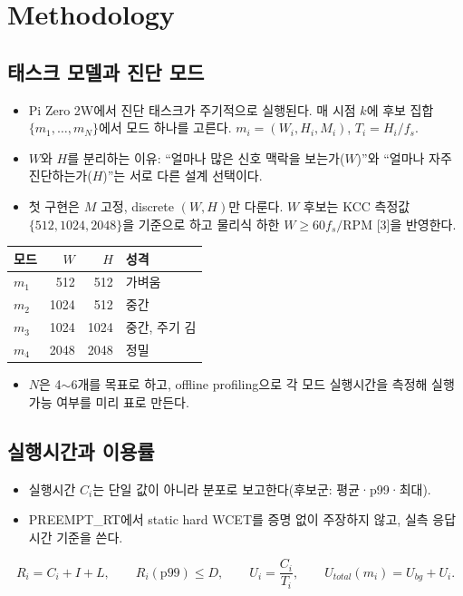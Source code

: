 \documentclass[10pt]{article}
\begin{document}
\section{Methodology}
\subsection{태스크 모델과 진단 모드}
\begin{itemize}
\item Pi Zero 2W에서 진단 태스크가 주기적으로 실행된다. 매 시점 $k$에 후보 집합 $\{m_1,\dots,m_N\}$에서 모드 하나를 고른다. $m_i=(W_i,H_i,M_i)$, $T_i=H_i/f_s$.
\item $W$와 $H$를 분리하는 이유: ``얼마나 많은 신호 맥락을 보는가($W$)''와 ``얼마나 자주 진단하는가($H$)''는 서로 다른 설계 선택이다.
\item 첫 구현은 $M$ 고정, discrete $(W,H)$만 다룬다. $W$ 후보는 KCC 측정값 $\{512,1024,2048\}$을 기준으로 하고 물리식 하한 $W\ge 60 f_s/\mathrm{RPM}$ [3]을 반영한다.
\end{itemize}
\begin{center}\footnotesize
\begin{tabular}{@{}lrrl@{}}
\toprule
모드 & $W$ & $H$ & 성격 \\ \midrule
$m_1$ & 512 & 512 & 가벼움 \\
$m_2$ & 1024 & 512 & 중간 \\
$m_3$ & 1024 & 1024 & 중간, 주기 김 \\
$m_4$ & 2048 & 2048 & 정밀 \\
\bottomrule
\end{tabular}
\end{center}
\begin{itemize}
\item $N$은 4$\sim$6개를 목표로 하고, offline profiling으로 각 모드 실행시간을 측정해 실행 가능 여부를 미리 표로 만든다.
\end{itemize}

\subsection{실행시간과 이용률}
\begin{itemize}
\item 실행시간 $C_i$는 단일 값이 아니라 분포로 보고한다(후보군: 평균·p99·최대).
\item PREEMPT\_RT에서 static hard WCET를 증명 없이 주장하지 않고, 실측 응답시간 기준을 쓴다.
\end{itemize}
\begin{equation}
R_i = C_i + I + L,\qquad R_i(\mathrm{p99}) \le D,\qquad U_i=\frac{C_i}{T_i},\qquad U_{total}(m_i)=U_{bg}+U_i.
\end{equation}
\end{document}
